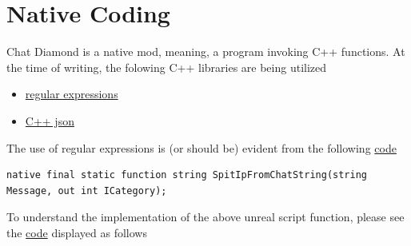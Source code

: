 \documentclass{article}
\theoremstyle{definition}
\begin{document}
\section{Native Coding}
Chat Diamond is a native mod, meaning, a program invoking C++ functions.  At the time of writing, the folowing C++ libraries are being utilized
\begin{itemize}
\item \href{https://en.cppreference.com/w/cpp/regex}{regular expressions}
  \item \href{https://github.com/nlohmann/json}{C++ json}
\end{itemize}

The use of regular expressions is (or should be) evident from the following \href{https://github.com/ravimohan1991/ChatDiamond/blob/6e3b684403fb75811c1cde6372c9125370bc796a/Classes/CDDiscordActor.uc#L61}{code}

\begin{lstlisting}[frame=single]
native final static function string SpitIpFromChatString(string Message, out int ICategory);
\end{lstlisting}

To understand the implementation of the above unreal script function, please see the \href{https://github.com/ravimohan1991/ChatDiamond/blob/6e3b684403fb75811c1cde6372c9125370bc796a/UTNativeEssentials/ChatDiamond/Src/ChatDiamondNative.cpp#L52}{code} displayed as follows
\end{document}
